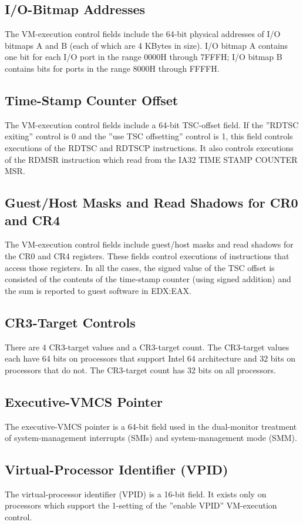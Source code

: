 \documentclass[10pt,draftclsnofoot,journal,compsoc,onecolumn]{IEEEtran}
\begin{document}
	\subsection{I/O-Bitmap Addresses}
	The VM-execution control fields include the 64-bit physical addresses of I/O bitmaps A and B (each of which are 4 KBytes in size). I/O bitmap A contains one bit for each I/O port in the range 0000H through 7FFFH; I/O bitmap B contains bits for ports in the range 8000H through FFFFH.
	
	\subsection{Time-Stamp Counter Offset}
	The VM-execution control fields include a 64-bit TSC-offset field. If the ”RDTSC exiting” control is 0 and the ”use TSC offsetting” control is 1, this field controls executions of the RDTSC and RDTSCP instructions. It also controls executions of the RDMSR instruction which read from the IA32 TIME STAMP COUNTER MSR.
	
	\subsection{Guest/Host Masks and Read Shadows for CR0 and CR4}
	The VM-execution control fields include guest/host masks and read shadows for the CR0 and CR4 registers. These fields control executions of instructions that access those registers. In all the cases, the signed value of the TSC offset is consisted of the contents of the time-stamp counter (using signed addition) and the sum is reported to guest software in EDX:EAX.
	
	\subsection{CR3-Target Controls}
	There are 4 CR3-target values and a CR3-target count. The CR3-target values each have 64 bits on processors that support Intel 64 architecture and 32 bits on processors that do not. The CR3-target count has 32 bits on all processors.
	
	\subsection{Executive-VMCS Pointer}
	The executive-VMCS pointer is a 64-bit field used in the dual-monitor treatment of system-management interrupts (SMIs) and system-management mode (SMM).
	
	\subsection{Virtual-Processor Identifier (VPID)}
	The virtual-processor identifier (VPID) is a 16-bit field. It exists only on processors which support the 1-setting of the ”enable VPID” VM-execution control.
	
\end{document}
